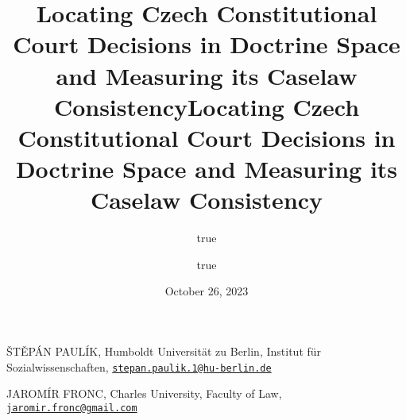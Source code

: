 \documentclass[
  11pt,
]{article}
\title{Locating Czech Constitutional Court Decisions in Doctrine Space
and Measuring its Caselaw Consistency}
\author{true \and true}
\date{October 26, 2023}
\title{Locating Czech Constitutional Court Decisions in Doctrine Space
and Measuring its Caselaw Consistency }
\date{}
\begin{document}



{%
\setlength{\parindent}{0pt}
\thispagestyle{plain}
{%
\maketitle  %

}




{
   \vskip 13.5pt\relax \normalsize\fontsize{11}{12}
   \MakeUppercase{Štěpán Paulík}, \small{Humboldt Universität zu Berlin,
Institut für Sozialwissenschaften,
\href{mailto:stepan.paulik.1@hu-berlin.de}{\nolinkurl{stepan.paulik.1@hu-berlin.de}}}   \par \vskip -3.5pt \MakeUppercase{Jaromír
Fronc}, \small{Charles University, Faculty of Law,
\href{mailto:jaromir.fronc@gmail.com}{\nolinkurl{jaromir.fronc@gmail.com}}}   

}

}
\end{document}
